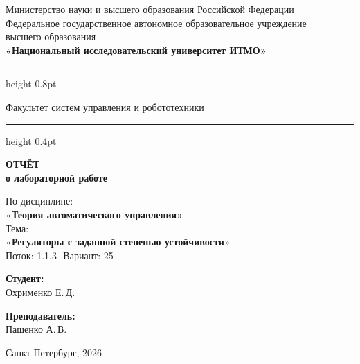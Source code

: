 \documentclass[a4paper,12pt]{article}
\begin{document}
	
	\begin{titlepage}
		\centering
		
		\vspace*{0.5cm}
		{\small
			Министерство науки и высшего образования Российской Федерации\\[2pt]
			Федеральное государственное автономное образовательное учреждение\\
			высшего образования\\[2pt]
			\textbf{«Национальный исследовательский университет ИТМО»}\\
		}
		
		\vspace{0.8cm}
		\hrule height 0.8pt
		\vspace{0.3cm}
		
		{\large Факультет систем управления и робототехники}
		
		\vspace{0.3cm}
		\hrule height 0.4pt
		\vspace{2.5cm}
		
		{\Huge\bfseries ОТЧЁТ}\\[0.4cm]
		{\LARGE\bfseries о лабораторной работе}\\[0.8cm]
		
		\begin{tcolorbox}[
			colback=gray!4,
			colframe=gray!10,
			boxrule=0.8pt,
			arc=4pt,
			left=12pt, right=12pt, top=8pt, bottom=8pt
			]
			\centering
			{\large По дисциплине:\\[4pt]}
			{\large\bfseries «Теория автоматического управления»}\\[10pt]
			{\large Тема:\\[4pt]}
			{\large\bfseries «Регуляторы с заданной степенью устойчивости»} \\[10pt]
			{\large Поток: 1.1.3 \( \) Вариант: 25}
		\end{tcolorbox}
		
		\vspace{3cm}
		
		\begin{minipage}{0.45\textwidth}
			\raggedright
			{\large\bfseries Студент:}\\[4pt]
			Охрименко Е.\,Д.\\
		\end{minipage}
		\hfill
		\begin{minipage}{0.45\textwidth}
			\raggedleft
			{\large\bfseries Преподаватель:}\\[4pt]
			Пашенко А.\,В.\\
		\end{minipage}
		
		\vfill
		\vspace{0.4cm}
		{\large Санкт-Петербург, 2026}
	\end{titlepage}
	
\end{document}

